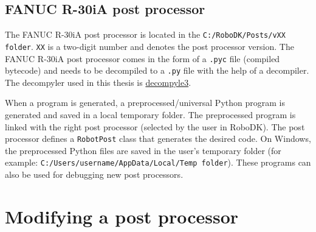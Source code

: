 \subsection{FANUC R-30iA post processor}

The FANUC R-30iA post processor is located in the \texttt{C:/RoboDK/Posts/vXX folder}. \texttt{XX} is a two-digit number and denotes the post processor version. The FANUC R-30iA post processor comes in the form of a \texttt{.pyc} file (compiled bytecode) and needs to be decompiled to a \texttt{.py} file with the help of a decompiler. The decompyler used in this thesis is   \href{https://github.com/rocky/python-decompile3}{decompyle3}.

When a program is generated, a preprocessed/universal Python program is generated and saved in a local temporary folder. The preprocessed program is linked with the right post processor (selected by the user in RoboDK). The post processor defines a \texttt{RobotPost} class that generates the desired code. On Windows, the preprocessed Python files are saved in the user's temporary folder (for example: \texttt{C:/Users/username/AppData/Local/Temp folder}). These programs can also be used for debugging new post processors.


\section{Modifying a post processor}


